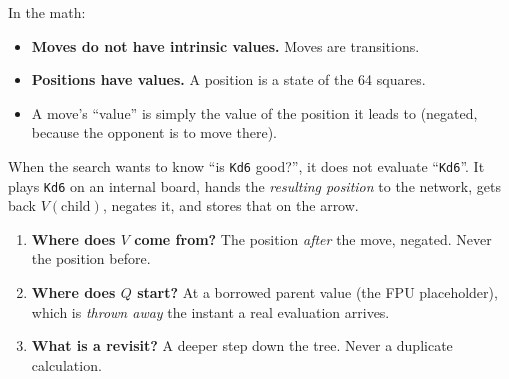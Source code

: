 In the math:
\begin{itemize}[leftmargin=2em]
  \item \textbf{Moves do not have intrinsic values.} Moves are transitions.
  \item \textbf{Positions have values.} A position is a state of the 64 squares.
  \item A move's ``value'' is simply the value of the position it leads to (negated, because the opponent is to move there).
\end{itemize}

When the search wants to know ``is \texttt{Kd6} good?'', it does not evaluate ``\texttt{Kd6}''. It plays \texttt{Kd6} on an internal board, hands the \textit{resulting position} to the network, gets back $V(\text{child})$, negates it, and stores that on the arrow.

\begin{established}
\begin{enumerate}[leftmargin=2em]
  \item \textbf{Where does $V$ come from?} The position \textit{after} the move, negated. Never the position before.
  \item \textbf{Where does $Q$ start?} At a borrowed parent value (the FPU placeholder), which is \textit{thrown away} the instant a real evaluation arrives.
  \item \textbf{What is a revisit?} A deeper step down the tree. Never a duplicate calculation.
\end{enumerate}
\end{established}
